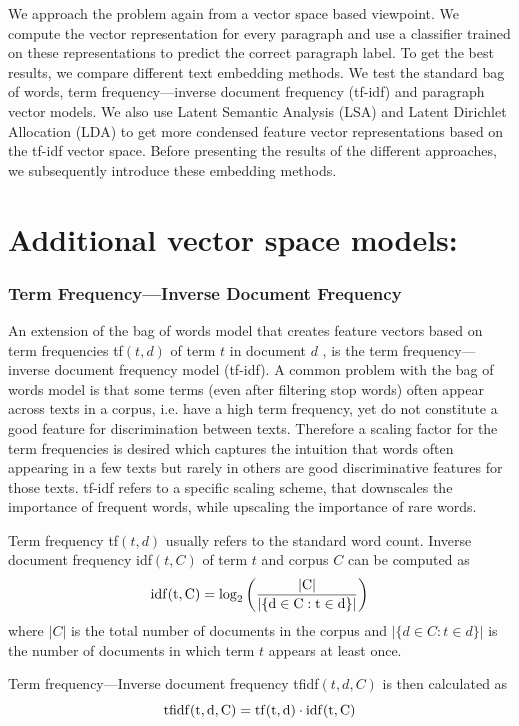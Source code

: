 We approach the problem again from a vector space based viewpoint. We compute the vector representation for every paragraph and use a classifier trained on these representations to predict the correct paragraph label. To get the best results, we compare different text embedding methods. We test the standard bag of words, term frequency---inverse document frequency (tf-idf) and paragraph vector models. We also use Latent Semantic Analysis (LSA) and Latent Dirichlet Allocation (LDA) to get more condensed feature vector representations based on the tf-idf vector space. Before presenting the results of the different approaches, we subsequently introduce these embedding methods.

\section*{Additional vector space models:}

\subsubsection*{Term Frequency---Inverse Document Frequency}

An extension of the bag of words model that creates feature vectors based on term frequencies tf$(t,d)$ of term $t$ in document $d$ , is the term frequency---inverse document frequency model (tf-idf).
A common problem with the bag of words model is that some terms (even
after filtering stop words) often appear across texts in a corpus,
i.e. have a high term frequency, yet do not constitute a good feature
for discrimination between texts. Therefore a scaling factor for the
term frequencies is desired which captures the intuition that words
often appearing in a few texts but rarely in others are good discriminative
features for those texts. tf-idf refers to a specific scaling scheme, that downscales the
importance of frequent words, while upscaling the importance of rare
words. 

Term frequency tf$(t,d)$ usually refers to the standard word count.
Inverse document frequency idf$(t,C)$ of term $t$ and corpus $C$
can be computed as 
\[
\rm{idf}(t,C)=\log_{2}\left(\frac{|C|}{|\{d\in C:t\in d\}|}\right)
\]
where $|C|$ is the total number of documents in the corpus and $|\{d\in C:t\in d\}|$
is the number of documents in which term $t$ appears at least once.

Term frequency---Inverse document frequency tfidf$(t,d,C)$ is then
calculated as 
\[
\rm{tfidf}(t,d,C)=\rm{tf}(t,d)\cdot \rm{idf}(t,C)
\]


